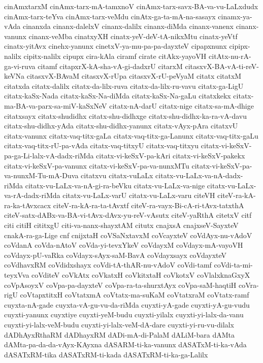 {cinAmxtarxM
cinAmx-tarx-mA-tamxnoV
cinAmx-tarx-savx-BA-va-vu-LaLxdudx
cinAmx-tarx-teYva
cinAmx-tarx-veMdu
cinAtx-ga-ta-mA-na-sasayx
cinamx-ya-vAda
cinanxda
cinanx-dalelxV
cinanx-dalilx
cinanx-diMda
cinanx-vanenx
cinanx-vanunx
cinanx-veMba
cinatxyXH
cinatx-yeV-deV-tA-nikxMtu
cinatx-yeVtf
cinatx-yitAvx
cinehx-yanunx
cinetxV-ya-mu-pa-pa-dayxteV
cipapxnunx
cipipx-nalilx
cipitx-nalilx
cipupx
cira-kAla
ciramf
cirate
citAkx-yayoVH
citAtx-nu-rA-ga-vi-ruva
citamf
citapxrX-kA-sha-vA-gi-dadxrU
citarxM
citasxvX-BA-vA-ti-reV-keVNa
citasxvX-BAvaM
citasxvX-rUpa
citasxvX-rU-peVyaM
citatx
citatxM
citatxda
citatx-dalilx
citatx-da-lilx-ruva
citatx-da-lilx-ru-vavu
citatx-ga-LigU
citatx-kaSx-Nada
citatx-kaSx-Na-diMda
citatx-kaSx-Na-gaLu
citatxkekx
citatx-ma-BA-va-parx-sa-miV-kaSxNeV
citatx-nA-darU
citatx-nige
citatx-sa-mA-dhige
citatxsayx
citatx-shudidhx
citatx-shu-didhxge
citatx-shu-didhx-ka-ra-vA-davu
citatx-shu-didhx-yAda
citatx-shu-didhx-yanunx
citatx-vAyx-pAra
citatxvU
citatx-vanunx
citatx-vaq-titx-gaLa
citatx-vaq-titx-ga-Lanunx
citatx-vaq-titx-gaLu
citatx-vaq-titx-rU-pa-vAda
citatx-vaq-titxyU
citatx-vaq-titxyu
citatx-vi-keSxV-pa-ga-Li-lalx-vA-dadx-riMda
citatx-vi-keSxV-pa-kAri
citatx-vi-keSxV-pakekx
citatx-vi-keSxV-pa-vanunx
citatx-vi-keSxV-pa-va-nunxMTu
citatx-vi-keSxV-pa-va-nunxM-Tu-mA-Duva
citatxvu
citatx-vuLaLx
citatx-vu-LaLx-va-nA-dadx-riMda
citatx-vu-LaLx-va-nA-gi-ra-beVku
citatx-vu-LaLx-va-nige
citatx-vu-LaLx-va-rA-dadx-riMda
citatx-vu-LaLx-varU
citatx-vu-LaLx-varu
citeVH
citeV-ra-kA-ra-ka-tAvxcacx
citeV-ra-kA-ra-ta-tAvxtf
citeV-ra-vayx-Bi-cA-ri-tAvx-tatxthA
citeV-satx-dABx-va-BA-vi-tAvx-dAvx-yu-reV-vAsutx
citeV-yaRthA
citetxV
citf
citi
citiH
cititxgU
citi-va-nanx-shayxtAM
citutx
cnajxsA
cnajxseV-SayxteV
cnakA-ra-ga-Lige
cnf
cnijxtaH
coVSaNxtavxM
coVcayxteV
coVdAyx-nu-vAdoV
coVdanA
coVda-nAtoV
coVda-yi-tevxYkeV
coVdayxM
coVdayx-mA-vayoVH
coVdayx-pU-vaRka
coVdayx-sAyx-saM-BavA
coVdayxsayx
coVdayxteV
coVdhavxRM
coVdidxshayx
coVdi-tA-thAR-nu-vAdoV
coVdi-tamf
coVdi-ta-mi-teyxVva
coVditeV
coVkAtx
coVkatxH
coVkitxtaH
coVkotxV
coVlalxknaGxyX
coVpAsoyxV
coVpa-pa-dayxteV
coVpa-ra-ta-shurxtAyx
coVpa-saM-haqtiH
coVra-rigU
coVtapxtitxH
coVtatxmA
coVtatx-ma-suKaM
coVtatxraM
coVtatx-ramf
cuyxta-nA-gade
cuyxta-vA-gu-vu-da-riMda
cuyxti-yA-gade
cuyxti-yA-gu-vudu
cuyxti-yanunx
cuyxtiye
cuyxti-yeM-budu
cuyxti-yilalx
cuyxti-yi-lalx-da-vanu
cuyxti-yi-lalx-veM-budu
cuyxti-yi-lalx-veM-dA-dare
cuyxti-yi-ru-vu-dilalx
dADhAyxRthaRM
dADhayxRM
dADi-mA-di-PalaM
dALiM-bara
dAMta
dAMta-pa-da-da-vAyx-KAyxna
dASARM-ti-ka-vanunx
dASATxM-ti-ka-vAda
dASATxRM-tika
dASATxRM-ti-kada
dASATxRM-ti-ka-ga-Lalilx
}
